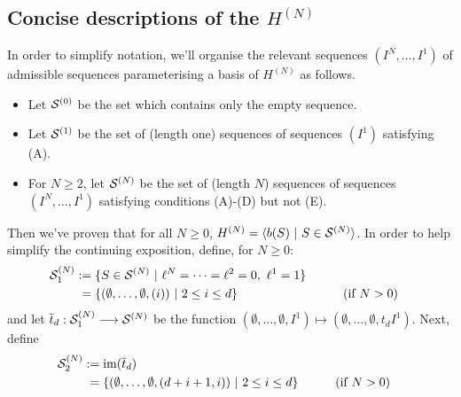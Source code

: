 \documentclass[11pt]{article}
\renewcommand{\Q}{Q}
\begin{document}
\begin{CalculatingRepeatedKoszul}
\subsection{Concise descriptions of the $H^{(N)}$}
In order to simplify notation, we'll organise the relevant sequences $(I^{N},\ldots,I^1)$ of admissible sequences parameterising a basis of $H^{{(N)}}$ as follows.
\begin{itemize}
\squishlist
\item Let $\mathcal{S}^{(0)}$ be the set which contains only the empty sequence.
\item Let $\mathcal{S}^{(1)}$ be the set of (length one) sequences of sequences $(I^1)$ satisfying (A).
\item For $N\geq2$, let $\mathcal{S}^{(N)}$ be the set of (length $N$) sequences of sequences $(I^{N},\ldots,I^1)$ satisfying conditions (A)-(D) but not (E).
\end{itemize}
Then we've proven that for all $N\geq0$, $H^{(N)}=\langle b(S)\ |\ S\in\mathcal{S}^{(N)}\rangle$.
In order to help simplify the continuing exposition, define, for $N\geq0$:
\begin{alignat*}{2}
\calS^{(N)}_1
&:=
\{S\in \calS^{(N)}\ |\ \ell^{N}=\cdots =\ell^2=0,\ \ell^1=1\}%
\\
&\phantom{:}=
\{(\emptyset,\ldots,\emptyset,(i))\ |\ 2\leq i\leq d\}&\qquad&\text{(if $N>0$)}
\end{alignat*}
and let $\overline{t}_d:\mathcal{S}_1^{(N)}\longrightarrow\mathcal{S}^{(N)}$ be the function $(\emptyset,\ldots,\emptyset,I^1)\mapsto (\emptyset,\ldots,\emptyset,t_dI^1)$. Next, define
\begin{alignat*}{2}
\calS^{(N)}_2
&:=
\im(\overline{t}_d)%
\\
&\phantom{:}=
\{(\emptyset,\ldots,\emptyset,(d+i+1,i))\ |\ 2\leq i\leq d\}%
&\qquad&\text{(if $N>0$)}
\end{alignat*}


\end{CalculatingRepeatedKoszul}
\end{document}
